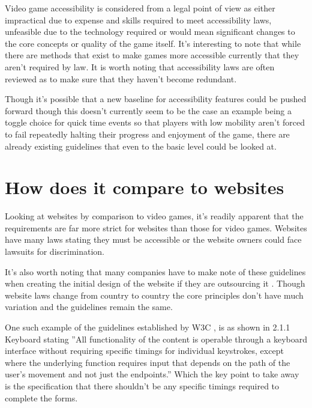 \documentclass{scrartcl}
\begin{document}
Video game accessibility is considered from a legal point of view as either impractical due to expense and skills required to meet accessibility laws, unfeasible due to the technology required or would mean significant  changes to the core concepts or quality of the game itself. \cite{powers2015video} It's interesting to note that while there are methods that exist to make games more accessible currently that they aren't required by law. It is worth noting that accessibility laws are often reviewed as to make sure that they haven't become redundant. 

Though it's possible that a new baseline for accessibility features could be pushed forward though this doesn't currently seem to be the case an example being a toggle choice for quick time events so that players with low mobility aren't forced to fail repeatedly halting their progress and enjoyment of the game, there are already existing guidelines \cite{game2012accessability} that even to the basic level could be looked at.

\section{How does it compare to websites}

Looking at websites by comparison to video games, it's readily apparent that the requirements are far more strict for websites than those for video games. Websites have many laws stating they must be accessible or the website owners could face lawsuits for discrimination. \cite{caldwell2008web} 

It's also worth noting that many companies have to make note of these guidelines when creating the initial design of the website if they are outsourcing it \cite{lawson2005web}. Though website laws change from country to country the core principles don't have much variation and the guidelines remain the same. 

One such example of the guidelines established by W3C \cite{wcag2017quick}, is as shown in 2.1.1 Keyboard stating ''All functionality of the content is operable through a keyboard interface without requiring specific timings for individual keystrokes, except where the underlying function requires input that depends on the path of the user's movement and not just the endpoints.'' Which the key point to take away is the specification that there shouldn't be any specific timings required to complete the forms.
\end{document}
